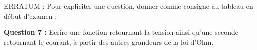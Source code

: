 \documentclass[cours, noCustomPackages, basic]{UPSTI_Document}
\begin{document}
ERRATUM : Pour expliciter une question, donner comme consigne au tableau en début d'examen : 

\textbf{Question 7 : } Ecrire une fonction retournant la tension ainsi qu'une seconde retournant le courant, à partir des autres grandeurs de la loi d'Ohm. 
\end{document}
